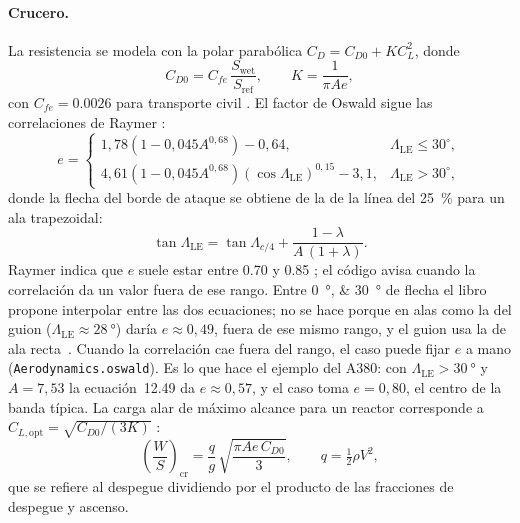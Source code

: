 \documentclass[11pt,a4paper]{article}
\begin{document}
\paragraph{Crucero.} La resistencia se modela con la polar parabólica
$C_D = C_{D0} + K C_L^2$, donde
\begin{equation}
  C_{D0} = C_{fe}\,\frac{S_\text{wet}}{S_\text{ref}}, \qquad
  K = \frac{1}{\pi A e},
\end{equation}
con $C_{fe}=\num{0.0026}$ para transporte civil \cite[ec.~12.23,
tabla~12.3]{raymer6}. El factor de Oswald sigue las correlaciones de Raymer
\cite[ecs.~12.48--12.49]{raymer6}:
\begin{equation}
  e =
  \begin{cases}
    1{,}78\left(1-0{,}045A^{0{,}68}\right) - 0{,}64,
      & \Lambda_\text{LE} \le 30^\circ, \\[4pt]
    4{,}61\left(1-0{,}045A^{0{,}68}\right)\left(\cos\Lambda_\text{LE}\right)^{0{,}15} - 3{,}1,
      & \Lambda_\text{LE} > 30^\circ,
  \end{cases}
\end{equation}
donde la flecha del borde de ataque se obtiene de la de la línea del
\SI{25}{\percent} para un ala trapezoidal:
\begin{equation}
  \tan\Lambda_\text{LE} = \tan\Lambda_{c/4} + \frac{1-\lambda}{A\,(1+\lambda)} .
\end{equation}
Raymer indica que $e$ suele estar entre \num{0.70} y \num{0.85}
\cite[sec.~12.6.1]{raymer6}; el código avisa cuando la correlación da un valor
fuera de ese rango. Entre \SIlist{0;30}{\degree} de flecha el libro propone
interpolar entre las dos ecuaciones; no se hace porque en alas como la del guion
($\Lambda_\text{LE}\approx\SI{28}{\degree}$) daría $e\approx0{,}49$, fuera de ese
mismo rango, y el guion usa la de ala recta~\cite{guion}.
Cuando la correlación cae fuera del rango, el caso puede fijar $e$ a mano
(\texttt{Aerodynamics.oswald}). Es lo que hace el ejemplo del A380: con
$\Lambda_\text{LE} > \SI{30}{\degree}$ y $A = 7{,}53$ la ecuación~12.49 da
$e \approx 0{,}57$, y el caso toma $e = 0{,}80$, el centro de la banda típica.
La carga alar de máximo alcance para un reactor corresponde a
$C_{L,\text{opt}} = \sqrt{C_{D0}/(3K)}$ \cite[ec.~5.14]{raymer6}:
\begin{equation}
  \left(\frac{W}{S}\right)_\text{cr} = \frac{q}{g}\,\sqrt{\frac{\pi A e\,C_{D0}}{3}},
  \qquad q = \tfrac{1}{2}\rho V^2,
\end{equation}
que se refiere al despegue dividiendo por el producto de las fracciones de
despegue y ascenso.
\end{document}
